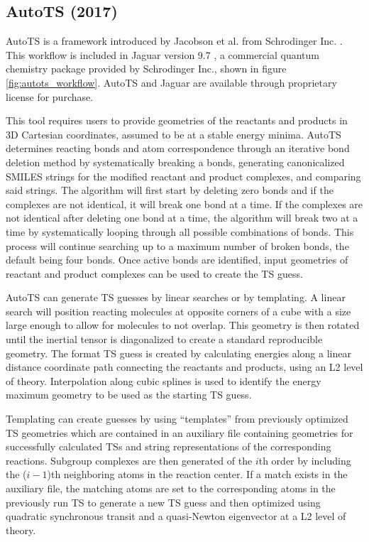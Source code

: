 \documentclass[preprint, 11pt]{elsarticle} %
\begin{document}
\subsection{AutoTS (2017)}

AutoTS is a framework introduced by Jacobson et al. from Schrodinger Inc. \cite{jacobson:2017}. 
This workflow is included in Jaguar version 9.7 \cite{Jaguar:2013}, a commercial quantum chemistry package provided by Schrodinger Inc., shown in figure \ref{fig:autots_workflow}.
AutoTS and Jaguar are available through proprietary license for purchase.

This tool requires users to provide geometries of the reactants and products in 3D Cartesian coordinates, assumed to be at a stable energy minima.
AutoTS determines reacting bonds and atom correspondence through an iterative bond deletion method by systematically breaking a bonds, generating canonicalized SMILES strings for the modified reactant and product complexes, and comparing said strings.
The algorithm will first start by deleting zero bonds and if the complexes are not identical, it will break one bond at a time.
If the complexes are not identical after deleting one bond at a time, the algorithm will break two at a time by systematically looping through all possible combinations of bonds.
This process will continue searching up to a maximum number of broken bonds, the default being four bonds.
Once active bonds are identified, input geometries of reactant and product complexes can be used to create the TS guess.

AutoTS can generate TS guesses by linear searches or by templating. 
A linear search will position reacting molecules at opposite corners of a cube with a size large enough to allow for molecules to not overlap.
This geometry is then rotated until the inertial tensor is diagonalized to create a standard reproducible geometry.
The format TS guess is created by calculating energies along a linear distance coordinate path connecting the reactants and products, using an L2 level of theory.
Interpolation along cubic splines is used to identify the energy maximum geometry to be used as the starting TS guess.

Templating can create guesses by using ``templates''  from previously optimized TS geometries which are contained in an auxiliary file containing geometries for successfully calculated TSs and string representations of the corresponding reactions.
Subgroup complexes are then generated of the $i$th order by including the ($i-1$)th neighboring atoms in the reaction center. 
If a match exists in the auxiliary file, the matching atoms are set to the corresponding atoms in the previously run TS to generate a new TS guess and  then optimized using quadratic synchronous transit and a quasi-Newton eigenvector at a L2 level of theory.
\end{document}
